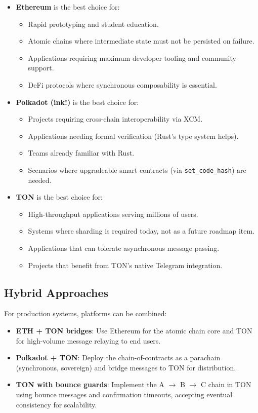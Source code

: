 \begin{itemize}
    \item \textbf{Ethereum} is the best choice for:
    \begin{itemize}
        \item Rapid prototyping and student education.
        \item Atomic chains where intermediate state must not be persisted on failure.
        \item Applications requiring maximum developer tooling and community support.
        \item DeFi protocols where synchronous composability is essential.
    \end{itemize}

    \item \textbf{Polkadot (ink!)} is the best choice for:
    \begin{itemize}
        \item Projects requiring cross-chain interoperability via XCM.
        \item Applications needing formal verification (Rust's type system helps).
        \item Teams already familiar with Rust.
        \item Scenarios where upgradeable smart contracts (via \texttt{set\_code\_hash}) are needed.
    \end{itemize}

    \item \textbf{TON} is the best choice for:
    \begin{itemize}
        \item High-throughput applications serving millions of users.
        \item Systems where sharding is required today, not as a future roadmap item.
        \item Applications that can tolerate asynchronous message passing.
        \item Projects that benefit from TON's native Telegram integration.
    \end{itemize}
\end{itemize}

\subsection{Hybrid Approaches}

For production systems, platforms can be combined:

\begin{itemize}
    \item \textbf{ETH + TON bridges}: Use Ethereum for the atomic chain core
          and TON for high-volume message relaying to end users.
    \item \textbf{Polkadot + TON}: Deploy the chain-of-contracts as a parachain
          (synchronous, sovereign) and bridge messages to TON for distribution.
    \item \textbf{TON with bounce guards}: Implement the A $\to$ B $\to$ C chain
          in TON using bounce messages and confirmation timeouts, accepting
          eventual consistency for scalability.
\end{itemize}

